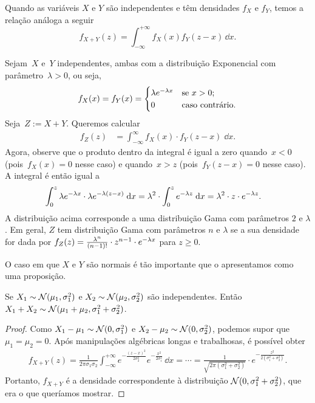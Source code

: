 Quando as variáveis $ X $ e $ Y $ são independentes e têm densidades $ f_X $ e $ f_Y $, temos a relação análoga a seguir
\[
f_{X+Y}(z)= \int_{-\infty}^{+\infty} f_{X}(x)f_{Y}(z-x)\, \dd x
.
\]

\begin{example}
Sejam~$X$ e~$Y$ independentes, ambas com a distribuição Exponencial com parâmetro~$\lambda >0$, ou seja,
\[f_X(x) = f_Y(x) =\begin{cases} \lambda e ^{-\lambda x}&\text{se } x > 0;\\ 0&\text{caso contrário.} \end{cases}\]
Seja~$Z := X+Y$.
Queremos calcular
\begin{align*}
 f_Z(z) &= \int_{-\infty}^\infty f_X(x)\cdot f_Y(z-x)\;\dd x.
 \end{align*}
Agora, observe que o produto dentro da integral é igual a zero quando~$x < 0$ (pois~$f_X(x) = 0$ nesse caso) e quando~$x > z$ (pois~$f_Y(z-x)= 0$ nesse caso). A integral é então igual a
\begin{align*}\int_0^z \lambda e ^{-\lambda x}\cdot \lambda e ^{-\lambda(z-x)}\;\mathrm{d} x &= \lambda^2\cdot \int_0^ze ^{-\lambda z} \;\mathrm{d} x = \lambda^2\cdot z\cdot e ^{-\lambda z}.\end{align*}
A distribuição acima corresponde a uma distribuição Gama com parâmetros $ 2 $ e $ \lambda $.
Em geral, $ Z $ tem distribuição Gama com parâmetros $ n $ e $ \lambda $ se a sua densidade for dada por $ f_Z(z) = \frac{\lambda^n}{(n-1)!}\cdot z^{n-1} \cdot e ^{-\lambda x} $ para $ z \geq 0 $.
\end{example}

O caso em que $ X $ e $ Y $ são normais é tão importante que o apresentamos como uma proposição.

\begin{proposition}
Se $X_1\sim \mathcal{N} (\mu_1,\sigma_1^2)$ e $X_2\sim \mathcal{N} (\mu_2,\sigma_2^2)$ são independentes.
Então $X_1 +X_2\sim \mathcal{N} (\mu_1 +\mu_2,\sigma_1^2 +\sigma_2^2)$.
\end{proposition}
\begin{proof}
Como $X_1 - \mu_1 \sim \mathcal{N} (0,\sigma_1^2) $ e $X_2 - \mu_2 \sim \mathcal{N} (0,\sigma_2^2) $, podemos supor que $\mu_1=\mu_2=0$.
Após manipulações algébricas longas e trabalhosas, é possível obter
\begin{align}
f_{X+Y}(z)= \frac{1}{2\pi\sigma_1\sigma_2}
\int_{-\infty}^{+\infty}
e^{-\frac{(z-x)^2}{2 \sigma_2^2}}
e^{-\frac{x^2}{2 \sigma_1^2}}
\, \dd x
=
\cdots
=
\tfrac{1}{\sqrt{2\pi(\sigma_1^2+\sigma_2^2)}}
\cdot
e^{-\frac{z^2}{2(\sigma_1^2 + \sigma_2^2) }}
.
\end{align}
Portanto, $f_{X+Y}$ é a densidade correspondente à distribuição $\mathcal{N} (0,\sigma_1^2 + \sigma_2^2)$, que era o que queríamos mostrar.
\end{proof}


